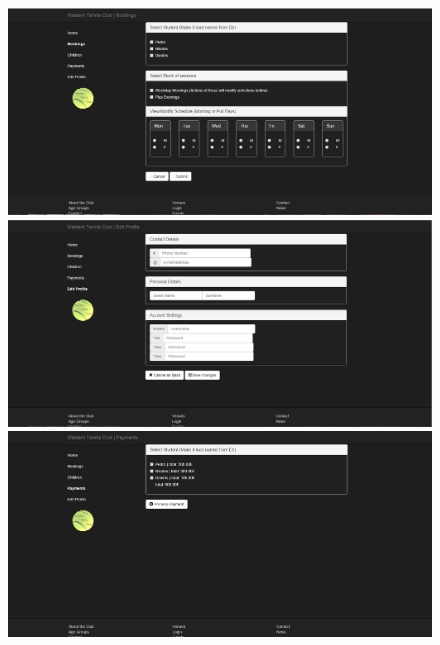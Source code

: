 \documentclass{l3proj}
\begin{document}
{
\begin{figure}[h]
\includegraphics[scale=0.35]{parenttemplate1.jpg}
\\
\includegraphics[scale=0.35]{parenttemplate2.jpg}
\\
\includegraphics[scale=0.35]{parenttemplate3.jpg}
\end{figure}
}

\pagebreak
\end{document}
